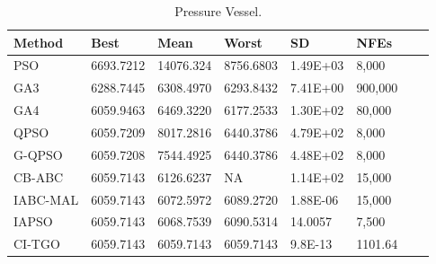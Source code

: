 
\begin{table*}[tp]
    \tiny
    \begin{center}
    
    \begin{tabular}{ P{2.0cm} P{2.0cm} P{2.0cm} P{2.0cm} P{2.0cm} P{2.0cm} P{2.0cm} P{2.0cm}  }
    \hline
    \textbf{Method} & \textbf{Best} & \textbf{Mean} & \textbf{Worst} & \textbf{SD} & \textbf{NFEs} \\
    \hline
    
    PSO & 6693.7212 & 14076.324 & 8756.6803 & 1.49E+03 & 8,000 \\
    GA3 & 6288.7445 & 6308.4970 & 6293.8432 & 7.41E+00 & 900,000 \\
    GA4 & 6059.9463 & 6469.3220 & 6177.2533 & 1.30E+02 & 80,000 \\
    QPSO & 6059.7209 & 8017.2816 & 6440.3786 & 4.79E+02 & 8,000 \\
    G-QPSO & 6059.7208 & 7544.4925 & 6440.3786 & 4.48E+02 & 8,000 \\
    CB-ABC & 6059.7143 & 6126.6237 & NA & 1.14E+02 & 15,000 \\
    IABC-MAL & 6059.7143 & 6072.5972 & 6089.2720 & 1.88E-06 & 15,000 \\
    IAPSO & 6059.7143 & 6068.7539 & 6090.5314 & 14.0057 & 7,500 \\
    CI-TGO & 6059.7143 & 6059.7143 & 6059.7143 & 9.8E-13 & 1101.64 \\
    
    \hline
    \end{tabular}
    \end{center}
    
    \caption{ Pressure Vessel. \\[1em]}
    \label{tab:PV}
    \end{table*}
    
    